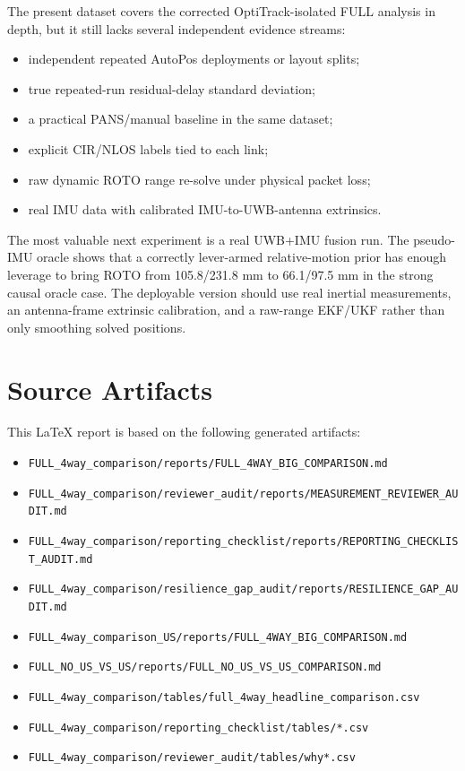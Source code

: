 \documentclass[11pt,a4paper]{article}
\newcommand{\case}[1]{\texttt{#1}}
\begin{document}
The present dataset covers the corrected OptiTrack-isolated FULL analysis in depth,
but it still lacks several independent evidence streams:
\begin{itemize}
    \item independent repeated AutoPos deployments or layout splits;
    \item true repeated-run residual-delay standard deviation;
    \item a practical PANS/manual baseline in the same dataset;
    \item explicit CIR/NLOS labels tied to each link;
    \item raw dynamic ROTO range re-solve under physical packet loss;
    \item real IMU data with calibrated IMU-to-UWB-antenna extrinsics.
\end{itemize}

The most valuable next experiment is a real UWB+IMU fusion run.  The pseudo-IMU
oracle shows that a correctly lever-armed relative-motion prior has enough leverage
to bring ROTO from 105.8/231.8 mm to 66.1/97.5 mm in the strong causal oracle case.
The deployable version should use real inertial measurements, an antenna-frame
extrinsic calibration, and a raw-range EKF/UKF rather than only smoothing solved
positions.

\section{Source Artifacts}

This LaTeX report is based on the following generated artifacts:
\begin{itemize}
    \item \case{FULL\_4way\_comparison/reports/FULL\_4WAY\_BIG\_COMPARISON.md}
    \item \case{FULL\_4way\_comparison/reviewer\_audit/reports/MEASUREMENT\_REVIEWER\_AUDIT.md}
    \item \case{FULL\_4way\_comparison/reporting\_checklist/reports/REPORTING\_CHECKLIST\_AUDIT.md}
    \item \case{FULL\_4way\_comparison/resilience\_gap\_audit/reports/RESILIENCE\_GAP\_AUDIT.md}
    \item \case{FULL\_4way\_comparison\_US/reports/FULL\_4WAY\_BIG\_COMPARISON.md}
    \item \case{FULL\_NO\_US\_VS\_US/reports/FULL\_NO\_US\_VS\_US\_COMPARISON.md}
    \item \case{FULL\_4way\_comparison/tables/full\_4way\_headline\_comparison.csv}
    \item \case{FULL\_4way\_comparison/reporting\_checklist/tables/*.csv}
    \item \case{FULL\_4way\_comparison/reviewer\_audit/tables/why*.csv}
\end{itemize}
\end{document}
